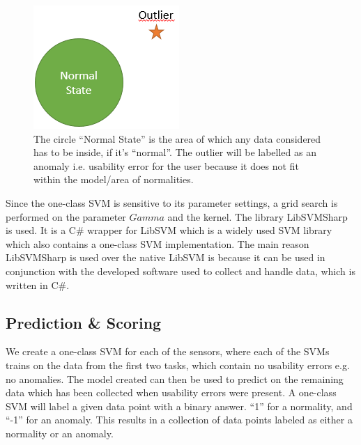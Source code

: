 \begin{figure}
    \centering
  \includegraphics[width=0.75\columnwidth]{graphics/oneclass-svm.png}
    \caption{The circle ``Normal State'' is the area of which any data considered has to be inside, if it's ``normal''. The outlier will be labelled as an anomaly i.e. usability error for the user because it does not fit within the model/area of normalities. }
    \label{[FIGURE] OneClass SVM}
\end{figure}

Since the one-class SVM is sensitive\cite{oneClassSVM} to its parameter settings, a grid search is performed on the parameter $Gamma$ and the kernel.
The library LibSVMSharp\cite{libsvmsharp} is used. It is a C\# wrapper for LibSVM\cite{libsvm} which is a widely used SVM library which also contains a one-class SVM implementation. The main reason LibSVMSharp is used over the native LibSVM is because it can be used in conjunction with the developed software used to collect and handle data, which is written in C\#.

\subsection{Prediction \& Scoring}
We create a one-class SVM for each of the sensors, where each of the SVMs trains on the data from the first two tasks, which contain no usability errors e.g. no anomalies. The model created can then be used to predict on the remaining data which has been collected when usability errors were present.
A one-class SVM will label a given data point with a binary answer. ``1'' for a normality, and ``-1'' for an anomaly.
This results in a collection of data points labeled as either a normality or an anomaly.

